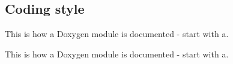 \hypertarget{a00059}{}\subsection{Coding style}
\label{a00059}


This is how a Doxygen module is documented -\/ start with a.  


This is how a Doxygen module is documented -\/ start with a. 

